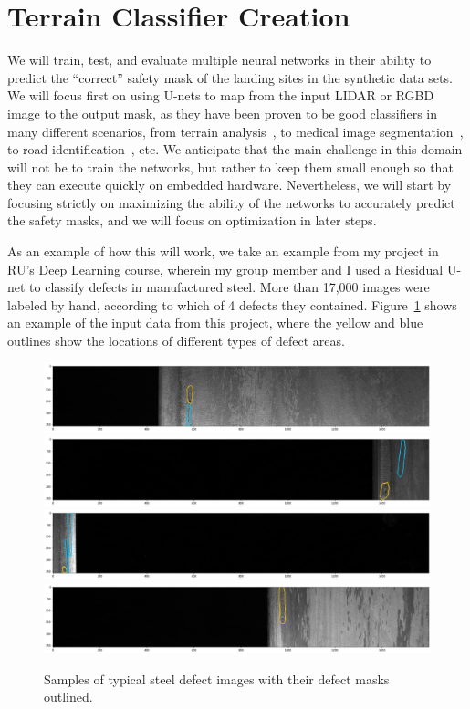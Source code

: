 \section{Terrain Classifier Creation}

We will train, test, and evaluate multiple neural networks in their ability to predict the
``correct'' safety mask of the landing sites in the synthetic data sets.
We will focus first on using U-nets to map from the input LIDAR or RGBD image
to the output mask, as they have been proven to be good classifiers in many different scenarios,
from terrain analysis~\cite{unet_semantic_terrain_segmentation}, to medical image segmentation~\cite{unet_medical_image_segmentation}, to road identification~\cite{unet_road_extraction}, etc.
We anticipate that the main challenge in this domain will not be
to train the networks, but rather to keep them small enough
so that they can execute quickly on embedded hardware.
Nevertheless, we will start by focusing strictly on maximizing the ability of the networks
to accurately predict the safety masks, and we will focus on optimization in later steps.

As an example of how this will work, we take an example from my project in RU's Deep Learning
course, wherein my group member and I used a Residual U-net to classify defects
in manufactured steel.
More than 17,000 images were labeled by hand, according to which of 4 defects they contained.
Figure~\ref{figure:steel_defect_images} shows an example of the input data from this project,
where the yellow and blue outlines show the locations of different types of defect areas.

\begin{figure}
    \centering
    \includegraphics[width=\textwidth]{images/masked_image_1.png}
    \includegraphics[width=\textwidth]{images/masked_image_2.png}
    \includegraphics[width=\textwidth]{images/masked_image_3.png}
    \includegraphics[width=\textwidth]{images/masked_image_4.png}
    \caption{Samples of typical steel defect images with their defect masks outlined.}
    \label{figure:steel_defect_images}
\end{figure}

